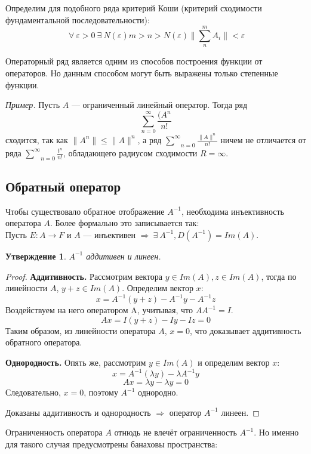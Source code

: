 \documentclass[12pt]{article}
\let\existstemp\exists
\let\foralltemp\forall
\renewcommand{\exists}{\: \existstemp \:}
\renewcommand{\forall}{\: \foralltemp \:}
\newcommand{\example}{{\itshape Пример. }}
\newcommand{\norm}[1]{\| #1 \|}
\newcommand{\Sum}[2]{\underset{#1}{\overset{#2}{\sum}}}
\renewcommand{\leq}{\leqslant}
\newtheorem{state}{Утверждение}[section] %
\begin{document}
	Определим для подобного ряда критерий Коши (критерий сходимости фундаментальной последовательности):
	$$\forall \varepsilon > 0 \exists N(\varepsilon) m > n > N(\varepsilon) \norm{ \Sum{n}{m} A_i } < \varepsilon$$
	
	Операторный ряд является одним из способов построения функции от операторов. Но данным способом могут быть выражены только степенные
	функции.
	
	\example Пусть $A$ --- ограниченный линейный оператор. Тогда ряд 
	$$\Sum{n = 0}{\infty} \frac{(A^n}{n!}$$
	сходится, так как $\norm{A^n} \leq \norm{A}^n$, а ряд $\Sum{n=0}{\infty} \frac{\norm{A}^n}{n!}$ ничем не отличается от ряда
	$\Sum{n=0}{\infty} \frac{t^n}{n!}$, обладающего радиусом сходимости $R = \infty$.
	
	\subsection*{Обратный оператор}
	
	Чтобы существовало обратное отображение $A^{-1}$, необходима инъективность оператора $A$. Более формально это записывается так: \\
	Пусть $E : A \rightarrow F$ и $A$ --- инъективен $\Rightarrow \exists A^{-1}, D(A^{-1}) = Im(A)$.
	
	\begin{state}
		$A^{-1}$ аддитивен и линеен.
	\end{state}
	\begin{proof}
		\textbf{Аддитивность.} Рассмотрим вектора $y \in Im(A), z \in Im(A)$, тогда по линейности $A$, $y + z \in Im(A)$.
		Определим вектор $x$:
		$$x = A^{-1}(y + z) - A^{-1} y - A^{-1} z$$
		Воздействуем на него оператором A, учитывая, что $A A^{-1} = I$.
		$$Ax = I(y + z) - I y - I z = 0$$
		Таким образом, из линейности оператора $A$, $x = 0$, что доказывает аддитивность обратного оператора.
		
		\textbf{Однородность.} Опять же, рассмотрим $y \in Im(A)$ и определим вектор $x$:
		$$ x = A^{-1}(\lambda y) - \lambda A^{-1} y $$
		$$ Ax = \lambda y - \lambda y = 0 $$
		Следовательно, $x = 0$, поэтому $A^{-1}$ однородно.
		
		Доказаны аддитивность и однородность $\Rightarrow$ оператор $A^{-1}$ линеен.
	\end{proof}
	
	Ограниченность оператора $A$ отнюдь не влечёт ограниченность $A^{-1}$. Но именно для такого случая предусмотрены банаховы 
	пространства:
	
\end{document}
